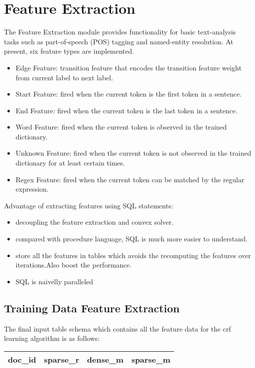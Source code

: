 \section{Feature Extraction}
The Feature Extraction module provides functionality for basic text-analysis
tasks such as part-of-speech (POS) tagging and named-entity resolution.
At present, six feature types are implemented.
    \begin{itemize}
    \item Edge Feature: transition feature that encodes the transition feature weight from current label to next label.
    \item Start Feature: fired when the current token is the first token in a sentence.
    \item End Feature: fired when the current token is the last token in a sentence.
    \item Word Feature: fired when the current token is observed in the trained dictionary.
    \item Unknown Feature: fired when the current token is not observed in the trained dictionary for at least certain times.
    \item Regex Feature: fired when the current token can be matched by the regular expression.
    \end{itemize}

Advantage of extracting features using SQL statements:
\begin{itemize}
\item decoupling the feature extraction and convex solver.
\item compared with procedure language, SQL is much more easier to understand.
\item store all the features in tables which avoids the recomputing the features over iterations.Also boost the performance.
\item SQL is naivelly paralleled
\end{itemize}

\subsection{Training Data Feature Extraction}
The final input table schema which contains all the feature data for the crf learning algorithm is as follows:
\begin{center}
    \begin{tabular}{ | l | l | l | l |}
    \hline
    doc\_id & sparse\_r & dense\_m & sparse\_m \\ 
    \hline
    \end{tabular}
\end{center}


